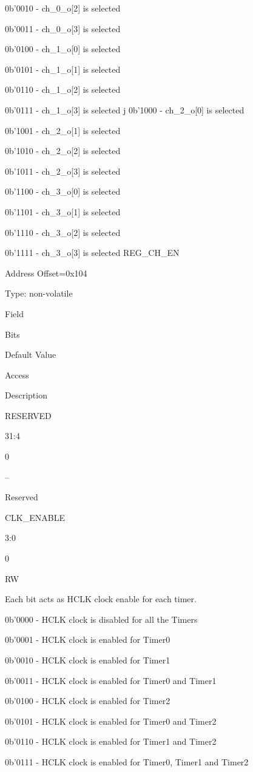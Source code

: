 0b’0010 - ch_0_o[2] is selected

0b’0011 - ch_0_o[3] is selected

0b’0100 - ch_1_o[0] is selected

0b’0101 - ch_1_o[1] is selected

0b’0110 - ch_1_o[2] is selected

0b’0111 - ch_1_o[3] is selected
j
0b’1000 - ch_2_o[0] is selected

0b’1001 - ch_2_o[1] is selected

0b’1010 - ch_2_o[2] is selected

0b’1011 - ch_2_o[3] is selected

0b’1100 - ch_3_o[0] is selected

0b’1101 - ch_3_o[1] is selected

0b’1110 - ch_3_o[2] is selected

0b’1111 - ch_3_o[3] is selected
REG_CH_EN

    Address Offset=0x104

    Type: non-volatile

Field
	

Bits
	

Default Value
	

Access
	

Description

RESERVED
	

31:4
	

0
	

–
	

Reserved

CLK_ENABLE
	

3:0
	

0
	

RW
	

Each bit acts as HCLK clock enable for each timer.

0b’0000 - HCLK clock is disabled for all the Timers

0b’0001 - HCLK clock is enabled for Timer0

0b’0010 - HCLK clock is enabled for Timer1

0b’0011 - HCLK clock is enabled for Timer0 and Timer1

0b’0100 - HCLK clock is enabled for Timer2

0b’0101 - HCLK clock is enabled for Timer0 and Timer2

0b’0110 - HCLK clock is enabled for Timer1 and Timer2

0b’0111 - HCLK clock is enabled for Timer0, Timer1 and Timer2

